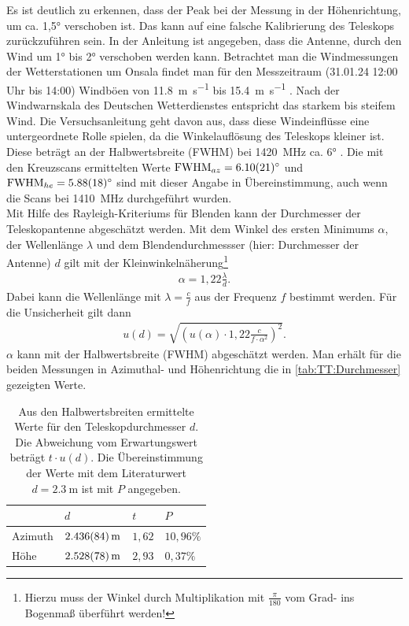 \documentclass[../../main.tex]{subfiles}
\begin{document}
    Es ist deutlich zu erkennen, dass der Peak bei der Messung in der Höhenrichtung, um ca. \ang{1,5} verschoben ist. Das kann auf eine falsche Kalibrierung des Teleskops zurückzuführen sein. In der Anleitung \cite{doc:SalsaManual} ist angegeben, dass die Antenne, durch den Wind um \ang{1} bis \ang{2} verschoben werden kann. Betrachtet man die Windmessungen der Wetterstationen um Onsala findet man für den Messzeitraum (31.01.24 12:00 Uhr bis 14:00) Windböen von \SI{11,8}{\metre \per \second} bis \SI{15,4}{\metre \per \second} \cite{Wetter:WindOnsala14h}. Nach der Windwarnskala des Deutschen Wetterdienstes \cite{Wetter:Windwarnskala} entspricht das \glqq{}starkem\grqq{} bis \glqq{}steifem\grqq{} Wind. Die Versuchsanleitung geht davon aus, dass diese Windeinflüsse eine untergeordnete Rolle spielen, da die Winkelauflösung des Teleskops kleiner ist. Diese beträgt an der Halbwertsbreite (FWHM) bei \SI{1420}{\mega \hertz} ca. \ang{6} \cite{doc:SalsaManual}. Die mit den Kreuzscans ermittelten Werte $\text{FWHM}_{az}=\ang{6,10 +- 0,21}$ und $\text{FWHM}_{he}=\ang{5.88 +- 0.18}$ sind mit dieser Angabe in Übereinstimmung, auch wenn die Scans bei \SI{1410}{\mega \hertz} durchgeführt wurden.\\
    Mit Hilfe des Rayleigh-Kriteriums für Blenden \cite{dewiki:RayleighKrit} kann der Durchmesser der Teleskopantenne abgeschätzt werden. Mit dem Winkel des ersten Minimums $\alpha$, der Wellenlänge $\lambda$ und dem Blendendurchmessser (hier: Durchmesser der Antenne) $d$ gilt mit der Kleinwinkelnäherung\footnote{Hierzu muss der Winkel durch Multiplikation mit $\frac{\pi}{180}$ vom Grad- ins Bogenmaß überführt werden!}
    \begin{align}
        \alpha = 1,22 \frac{\lambda}{d}.
    \end{align}
    Dabei kann die Wellenlänge mit $\lambda = \frac{c}{f}$ aus der Frequenz $f$ bestimmt werden. Für die Unsicherheit gilt dann
    \begin{align*}
        u(d) = \sqrt{\left( u(\alpha) \cdot 1,22 \frac{c}{f \cdot \alpha^{2}} \right)^{2}}.
    \end{align*}
    $\alpha$ kann mit der Halbwertsbreite (FWHM) abgeschätzt werden. Man erhält für die beiden Messungen in Azimuthal- und Höhenrichtung die in \autoref{tab:TT:Durchmesser} gezeigten Werte.
    \begin{table}[H]
        \centering
        \begin{tabular}{l|l|l|l}
        \rowcolor[HTML]{A6E1F4} 
                & $d$                           & $t$    & $P$        \\ \hline
        Azimuth & $\SI{2.436 +- 0.084}{\metre}$ & $1,62$ & $10,96\%$ \\ \hline
        Höhe    & $\SI{2.528 +- 0.078}{\metre}$ & $2,93$ & $0,37\%$ 
        \end{tabular}
        \caption{Aus den Halbwertsbreiten ermittelte Werte für den Teleskopdurchmesser $d$. Die Abweichung vom Erwartungswert beträgt $t \cdot u(d)$. Die Übereinstimmung der Werte mit dem Literaturwert $d=\SI{2,3}{\metre}$ ist mit $P$ angegeben. }
        \label{tab:TT:Durchmesser}
    \end{table}
\end{document}
